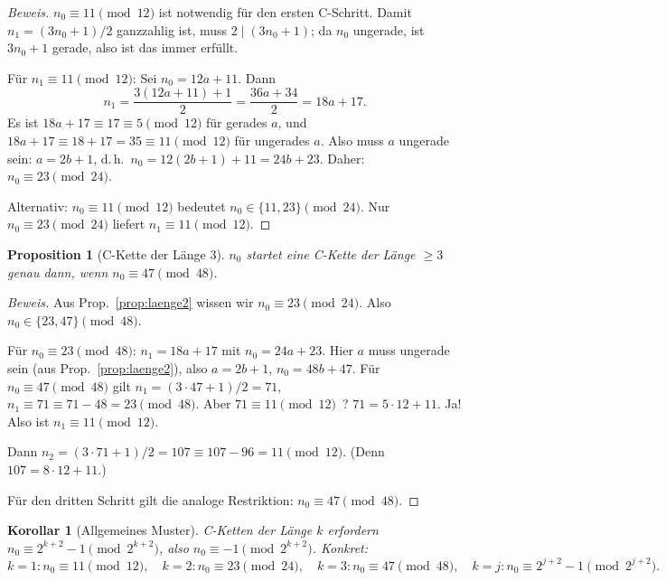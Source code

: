 \documentclass[12pt,a4paper]{article}
\newtheorem{proposition}[definition]{Proposition}
\newtheorem{korollar}[definition]{Korollar}
\newenvironment{beweis}{\begin{proof}[Beweis]}{\end{proof}}
\begin{document}
\begin{beweis}
$n_0 \equiv 11 \pmod{12}$ ist notwendig für den ersten C-Schritt.
Damit $n_1 = (3n_0+1)/2$ ganzzahlig ist, muss $2 \mid (3n_0+1)$; da $n_0$
ungerade, ist $3n_0+1$ gerade, also ist das immer erfüllt.

Für $n_1 \equiv 11 \pmod{12}$: Sei $n_0 = 12a + 11$. Dann
\[
  n_1 = \frac{3(12a+11)+1}{2} = \frac{36a+34}{2} = 18a + 17.
\]
Es ist $18a + 17 \equiv 17 \equiv 5 \pmod{12}$ für gerades $a$, und
$18a + 17 \equiv 18 + 17 = 35 \equiv 11 \pmod{12}$ für ungerades $a$.
Also muss $a$ ungerade sein: $a = 2b+1$, d.\,h.\ $n_0 = 12(2b+1)+11 = 24b+23$.
Daher: $n_0 \equiv 23 \pmod{24}$.

Alternativ: $n_0 \equiv 11 \pmod{12}$ bedeutet $n_0 \in \{11, 23\} \pmod{24}$.
Nur $n_0 \equiv 23 \pmod{24}$ liefert $n_1 \equiv 11 \pmod{12}$.
\end{beweis}

\begin{proposition}[C-Kette der Länge 3]
\label{prop:laenge3}
$n_0$ startet eine C-Kette der Länge $\geq 3$ genau dann, wenn
$n_0 \equiv 47 \pmod{48}$.
\end{proposition}

\begin{beweis}
Aus Prop.~\ref{prop:laenge2} wissen wir $n_0 \equiv 23 \pmod{24}$.
Also $n_0 \in \{23, 47\} \pmod{48}$.

Für $n_0 \equiv 23 \pmod{48}$: $n_1 = 18a + 17$ mit $n_0 = 24a+23$.
Hier $a$ muss ungerade sein (aus Prop.~\ref{prop:laenge2}), also
$a = 2b+1$, $n_0 = 48b + 47$.
Für $n_0 \equiv 47 \pmod{48}$ gilt $n_1 = (3\cdot47+1)/2 = 71$,
$n_1 \equiv 71 \equiv 71 - 48 = 23 \pmod{48}$. Aber $71 \equiv 11 \pmod{12}$~? 
$71 = 5\cdot12 + 11$. Ja! Also ist $n_1 \equiv 11 \pmod{12}$. \checkmark

Dann $n_2 = (3\cdot71+1)/2 = 107 \equiv 107 - 96 = 11 \pmod{12}$.
(Denn $107 = 8\cdot12 + 11$.) \checkmark

Für den dritten Schritt gilt die analoge Restriktion: $n_0 \equiv 47 \pmod{48}$.
\end{beweis}

\begin{korollar}[Allgemeines Muster]
\label{kor:muster}
C-Ketten der Länge $k$ erfordern $n_0 \equiv 2^{k+2}-1 \pmod{2^{k+2}}$,
also $n_0 \equiv -1 \pmod{2^{k+2}}$. Konkret:
\[
  k=1: n_0 \equiv 11 \pmod{12},\quad
  k=2: n_0 \equiv 23 \pmod{24},\quad
  k=3: n_0 \equiv 47 \pmod{48},\quad
  k=j: n_0 \equiv 2^{j+2}-1 \pmod{2^{j+2}}.
\]
\end{korollar}
\end{document}

